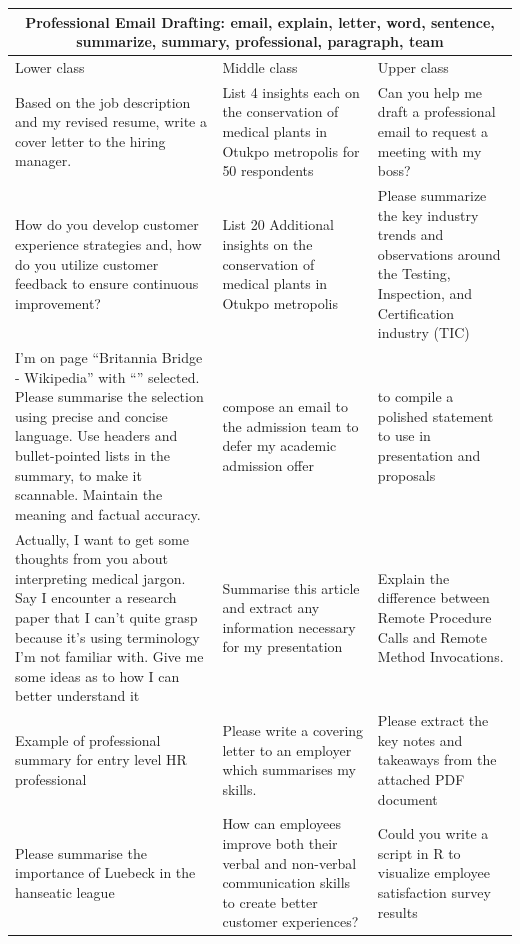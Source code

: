 \begin{table}[ht]
\centering
\small
\begin{tabular}{p{4.3cm}p{4.3cm}p{4.3cm}}
\toprule
\multicolumn{3}{c}{\textbf{Professional Email Drafting: email, explain, letter, word, sentence, summarize, summary, professional, paragraph, team}} \\
\midrule
Lower class & Middle class & Upper class \\
\midrule
Based on the job description and my revised resume, write a cover letter to the hiring manager. & List 4  insights each on the conservation of medical plants in Otukpo metropolis for 50 respondents & Can you help me draft a professional email to request a meeting with my boss? \\[4pt]
How do you develop customer experience strategies and, how do you utilize customer feedback to ensure continuous improvement? & List 20 Additional insights on the conservation of medical plants in Otukpo metropolis & Please summarize the key industry trends and observations around the Testing, Inspection, and Certification industry (TIC) \\[4pt]
I’m on page “Britannia Bridge - Wikipedia” with “” selected.  Please summarise the selection using precise and concise language. Use headers and bullet-pointed lists in the summary, to make it scannable. Maintain the meaning and factual accuracy. & compose an email to the admission team to defer my academic admission offer & to compile a polished statement to use in presentation and proposals \\[4pt]
Actually, I want to get some thoughts from you about interpreting medical jargon. Say I encounter a research paper that I can't quite grasp because it's using terminology I'm not familiar with. Give me some ideas as to how I can better understand it & Summarise this article and extract any information necessary for my presentation & Explain the difference between Remote Procedure Calls and Remote Method Invocations. \\[4pt]
Example of professional summary for entry level HR professional & Please write a covering letter to an employer which summarises my skills. & Please extract the key notes and takeaways from the attached PDF document \\[4pt]
Please summarise the importance of Luebeck in the hanseatic league & How can employees improve both their verbal and non-verbal communication skills to create better customer experiences? & Could you write a script in R to visualize employee satisfaction survey results \\[4pt]

\end{tabular}
\end{table}
